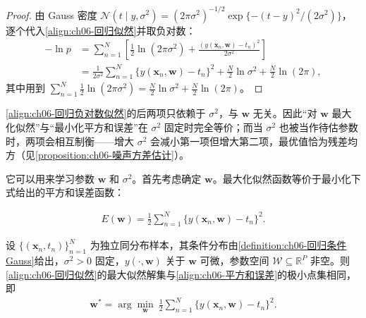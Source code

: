 \documentclass[../../main.tex]{subfiles}
\begin{document}
\begin{proof}
由 Gauss 密度 $\mathcal{N}(t\mid y,\sigma^{2})=(2\pi\sigma^{2})^{-1/2}\exp\{-(t-y)^{2}/(2\sigma^{2})\}$，逐个代入\eqref{align:ch06-回归似然}并取负对数：
\begin{align}
-\ln p&=\sum_{n=1}^{N}\left[\frac{1}{2}\ln(2\pi\sigma^{2})+\frac{(y(\boldsymbol{x}_n,\boldsymbol{w})-t_n)^{2}}{2\sigma^{2}}\right]\nonumber\\
&=\frac{1}{2\sigma^{2}}\sum_{n=1}^{N}\bigl\{y(\boldsymbol{x}_n,\boldsymbol{w})-t_n\bigr\}^{2}+\frac{N}{2}\ln\sigma^{2}+\frac{N}{2}\ln(2\pi),
\end{align}
其中用到 $\sum_{n=1}^{N}\frac{1}{2}\ln(2\pi\sigma^{2})=\frac{N}{2}\ln\sigma^{2}+\frac{N}{2}\ln(2\pi)$。
\end{proof}

\begin{remark}\eqref{align:ch06-回归负对数似然}的后两项只依赖于 $\sigma^{2}$，与 $\boldsymbol{w}$ 无关。因此“对 $\boldsymbol{w}$ 最大化似然”与“最小化平方和误差”在 $\sigma^{2}$ 固定时完全等价；而当 $\sigma^{2}$ 也被当作待估参数时，两项会相互制衡——增大 $\sigma^{2}$ 会减小第一项但增大第二项，最优值恰为残差均方（见\cref{proposition:ch06-噪声方差估计}）。
\end{remark}

它可以用来学习参数 $\boldsymbol{w}$ 和 $\sigma^{2}$。首先考虑确定 $\boldsymbol{w}$。最大化似然函数等价于最小化下式给出的平方和误差函数：

\begin{align}
E(\boldsymbol{w})=\frac{1}{2}\sum_{n=1}^{N}\bigl\{y(\boldsymbol{x}_n,\boldsymbol{w})-t_n\bigr\}^{2}.
\label{align:ch06-平方和误差}
\end{align}

\begin{proposition}[最大似然等价于最小平方和]\label{proposition:ch06-平方和误差}
设 $\{(\boldsymbol{x}_{n},t_{n})\}_{n=1}^{N}$ 为独立同分布样本，其条件分布由\cref{definition:ch06-回归条件Gauss}给出，$\sigma^{2}>0$ 固定，$y(\cdot,\boldsymbol{w})$ 关于 $\boldsymbol{w}$ 可微，参数空间 $\mathcal{W}\subseteq\mathbb{R}^{P}$ 非空。则\eqref{align:ch06-回归似然}的最大似然解集与\eqref{align:ch06-平方和误差}的极小点集相同，即
\begin{align}
\boldsymbol{w}^{\ast}=\arg\min_{\boldsymbol{w}}\ \frac{1}{2}\sum_{n=1}^{N}\bigl\{y(\boldsymbol{x}_n,\boldsymbol{w})-t_n\bigr\}^{2}.
\label{align:ch06-最大似然解}
\end{align}
\end{proposition}
\end{document}
